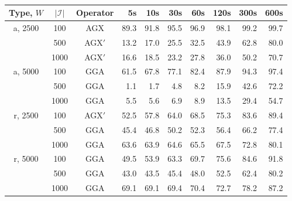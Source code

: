 \documentclass[authoryear]{elsarticle}
\begin{document}

\begin{table}[h!]
\setlength{\tabcolsep}{8pt}
\centering
\caption{}
\small
\begin{tabular}{cccrrrrrrr}
	\toprule
	Type, $W$ & $|\mathcal{I}|$ & Operator & 5s & 10s & 30s & 60s & 120s & 300s & 600s \\
	\midrule
	a, 2500 & 100 & AGX & 89.3 & 91.8 & 95.5 & 96.9 & 98.1 & 99.2 & 99.7 \\
	& 500 & AGX$'$ & 13.2 & 17.0 & 25.5 & 32.5 & 43.9 & 62.8 & 80.0 \\
	& 1000 & AGX$'$ & 16.6 & 18.5 & 23.2 & 27.8 & 36.0 & 50.2 & 70.7 \\
	\midrule
	a, 5000 & 100 & GGA & 61.5 & 67.8 & 77.1& 82.4 & 87.9 & 94.3 & 97.4 \\
	& 500 & GGA & 1.1 & 1.7 & 4.8 & 8.2 & 15.9 & 42.6 & 72.2 \\
	& 1000 & GGA & 5.5 & 5.6 & 6.9 & 8.9 & 13.5 & 29.4 & 54.7 \\
	\midrule
	\midrule
	r, 2500 & 100 & AGX$'$ & 52.5 & 57.8 & 64.0 & 68.5 & 75.3 & 83.6 & 89.4 \\
	& 500 & GGA & 45.4 & 46.8 & 50.2 & 52.3 & 56.4 & 66.2 & 77.4 \\
	& 1000 & GGA & 63.6 & 63.9 & 64.6 & 65.5 & 67.5 & 72.8 & 80.1 \\
	\midrule
	r, 5000 & 100 & GGA & 49.5 & 53.9 & 63.3 & 69.7 & 75.6 & 84.6 & 91.8 \\
	& 500 & GGA & 43.0 & 43.5 & 45.4 & 48.0 & 52.5 & 62.4 & 80.2 \\
	& 1000 & GGA & 69.1 & 69.1 & 69.4 & 70.4 & 72.7 & 78.2 & 87.2 \\
	\bottomrule
\end{tabular}	
\label{table:eatime}
\end{table}
\end{document}
